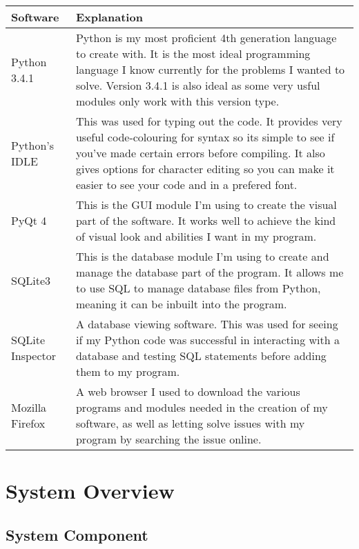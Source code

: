 \begin{center}
    \begin{tabular}{|p{3cm}|p{8cm}|}
	\hline
	\textbf{Software} & \textbf{Explanation} \\ \hline
	{Python 3.4.1} & {Python is my most proficient 4th generation language to create with. It is the most ideal programming language I know currently for the problems I wanted to solve. Version 3.4.1 is also ideal as some very usful modules only work with this version type.} \\ \hline
	{Python's IDLE} & {This was used for typing out the code. It provides very useful code-colouring for syntax so its simple to see if you've made certain errors before compiling. It also gives options for character editing so you can make it easier to see your code and in a prefered font.} \\ \hline
	{PyQt 4} & {This is the GUI module I'm using to create the visual part of the software. It works well to achieve the kind of visual look and abilities I want in my program.} \\ \hline
	{SQLite3} & {This is the database module I'm using to create and manage the database part of the program. It allows me to use SQL to manage database files from Python, meaning it can be inbuilt into the program.} \\ \hline
	{SQLite Inspector} & {A database viewing software. This was used for seeing if my Python code was successful in interacting with a database and testing SQL statements before adding them to my program.} \\ \hline
	{Mozilla Firefox} & {A web browser I used to download the various programs and modules needed in the creation of my software, as well as letting solve issues with my program by searching the issue online.} \\ \hline

    \end{tabular}
\end{center}

\section{System Overview}

\subsection{System Component}

